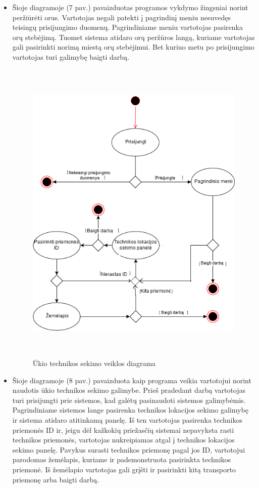 \documentclass[oneside]{VUMIFPSkursinis}
\begin{document}
\begin{itemize}
\item Šioje diagramoje (7 pav.) pavaizduotas programos vykdymo žingsniai norint peržiūrėti orus. Vartotojas negali patekti į pagrindinį meniu nesuvedęs teisingų prisijungimo duomenų. Pagrindiniame meniu vartotojas pasirenka orų stebėjimą. Tuomet sistema atidaro orų peržūros langą, kuriame vartotojas gali pasirinkti norimą miestą orų stebėjimui. Bet kuriuo metu po prisijungimo vartotojas turi galimybę baigti darbą.

	\begin{figure}[H]
	\centering	
	\includegraphics[width=15cm,height=15cm,keepaspectratio]{veiklos_diagrama_technikos_sekimas.png}
	\caption{Ūkio technikos sekimo veiklos diagrama}
	\label{}
	\end{figure}
\item Šioje diagramoje (8 pav.) pavaizduota kaip programa veikia vartotojui norint naudotis ūkio technikos sekimo galimybe. Prieš pradedant darbą vartotojas turi prisijungti prie sistemos, kad galėtų pasinaudoti sistemos galimybėmis. Pagrindiniame sistemos lange pasirenka technikos lokacijos sekimo galimybę ir sistema atidaro atitinkamą panelę. Iš ten vartotojas pasirenka technikos priemonės ID ir, jeigu dėl kažkokių priežasčių sistemai nepavyksta rasti technikos priemonės, vartotojas nukreipiamas atgal į technikos lokacijos sekimo panelę. Pavykus surasti technikos priemonę pagal jos ID, vartotojui parodomas žemėlapis, kuriame ir pademonstruota pasirinkta technikos priemonė. Iš žemėlapio vartotojas gali grįšti ir pasirinkti kitą transporto priemonę arba baigti darbą.
\pagebreak


\end{itemize}
\end{document}

